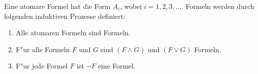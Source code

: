 Eine atomare Formel hat die Form $A_i$, wobei $i = 1,2,3,\ldots$. Formeln werden durch folgenden induktiven Prozesse definiert:
\begin{enumerate}
\item Alle atomaren Formeln sind Formeln.
\item F"ur alle Formeln $F$ und $G$ sind $(F \land G)$ und $(F \lor G)$ Formeln.
\item F"ur jede Formel $F$ ist $\neg F$ eine Formel.
\end{enumerate}


